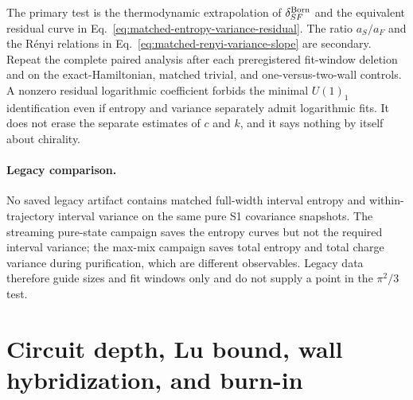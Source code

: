 \documentclass[aps,prx,onecolumn,nofootinbib,superscriptaddress,longbibliography]{revtex4-2}
\begin{document}
The primary test is the thermodynamic extrapolation of $\delta_{SF}^{\rm Born}$ and the
equivalent residual curve in Eq.~\eqref{eq:matched-entropy-variance-residual}.  The ratio
$a_S/a_F$ and the R\'enyi relations in Eq.~\eqref{eq:matched-renyi-variance-slope} are
secondary.  Repeat the complete paired analysis after each preregistered fit-window
deletion and on the exact-Hamiltonian, matched trivial, and one-versus-two-wall controls.
A nonzero residual logarithmic coefficient forbids the minimal $U(1)_1$ identification
even if entropy and variance separately admit logarithmic fits.  It does not erase the
separate estimates of $c$ and $k$, and it says nothing by itself about chirality.

\paragraph{Legacy comparison.}
No saved legacy artifact contains matched full-width interval entropy and
within-trajectory interval variance on the same pure S1 covariance snapshots.  The
streaming pure-state campaign saves the entropy curves but not the required interval
variance; the max-mix campaign saves total entropy and total charge variance during
purification, which are different observables.  Legacy data therefore guide sizes and fit
windows only and do not supply a point in the $\pi^2/3$ test.


\section{Circuit depth, Lu bound, wall hybridization, and burn-in}
\label{app:depth}
\end{document}

